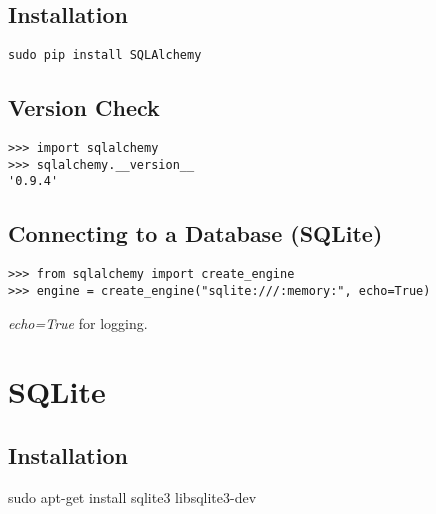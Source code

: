 \documentclass[a4paper, 12pt]{article}
\begin{document}
\subsection{Installation}
\verb|sudo pip install SQLAlchemy|
\subsection{Version Check}
\begin{verbatim}
>>> import sqlalchemy
>>> sqlalchemy.__version__
'0.9.4'
\end{verbatim}
\subsection{Connecting to a Database (SQLite)}
\begin{verbatim}
>>> from sqlalchemy import create_engine
>>> engine = create_engine("sqlite:///:memory:", echo=True)
\end{verbatim}
\emph{echo=True} for logging.

\section{SQLite}
\subsection{Installation}
sudo apt-get install sqlite3 libsqlite3-dev
\end{document}
